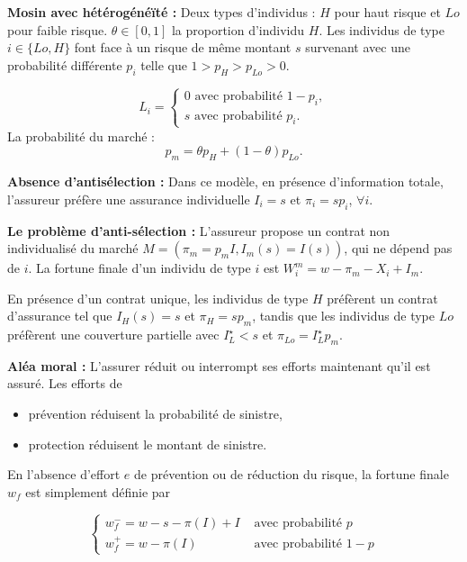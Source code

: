 \begin{f}
	
	\textbf{Mosin avec hétérogénéïté :} Deux types d'individus : \(H\) pour haut risque et \(Lo\) pour faible risque. \(\theta \in[0,1]\) la proportion d'individu \(H\). Les individus de type \(i \in\{Lo, H\}\) font face à un risque de même montant \(s\)  survenant avec une probabilité différente \(p_{i}\) telle que \(1>p_{H}>p_{Lo}>0\).
	
	\[
	L_{i}=\left\{\begin{array}{l}
		0 \text { avec probabilité } 1-p_{i}, \\
		s \text { avec probabilité } p_{i} .
	\end{array}\right.
	\]
La probabilité du marché :
	\[
	p_{m}=\theta p_{H}+(1-\theta) p_{Lo} .
	\]
\medskip

\textbf{Absence d'antisélection :}  Dans ce modèle, en présence d'information totale, l'assureur préfère une assurance individuelle \(I_{i}=s\) et \(\pi_{i}=s p_{i}\), \(\forall i\).

\textbf{Le problème d'anti-sélection : }
L'assureur propose un  contrat non individualisé du marché \(M=\left(\pi_{m}=p_{m} I, I_{m}(s)=I(s)\right)\), qui ne dépend pas de \(i\). La fortune finale d'un individu de type \(i\) est \(W_{i}^{m}=w-\pi_{m}-X_{i}+I_{m}\).

En présence d'un contrat unique, les individus de type \(H\) préfèrent un contrat d'assurance tel que \(I_{H}(s)=s\)  et \(\pi_{H}=s p_{m}\), tandis que les individus de type \(Lo\) préfèrent une couverture partielle avec \(I_{L}^{\star}<s\) et \(\pi_{Lo}=I_{L}^{\star} p_{m}\).
\medskip

\textbf{Aléa moral :}
L'assurer réduit ou interrompt ses efforts maintenant qu'il est assuré. Les efforts de
\begin{itemize}
	\item prévention réduisent la probabilité de sinistre,
	\item protection réduisent le montant de sinistre.
\end{itemize}

 En l'absence d'effort \(e\) de prévention ou de réduction du risque, la fortune finale \(w_{f}\) est simplement définie par

\[
\begin{cases}w_{f}^{-}=w-s-\pi(I)+I & \text { avec probabilité } p \\ w_{f}^{+}=w-\pi(I) & \text { avec probabilité } 1-p\end{cases}
\]


\end{f}
